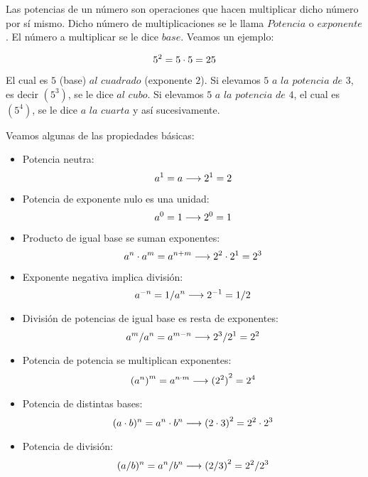Las potencias de un número son operaciones que hacen multiplicar dicho número por sí mismo. Dicho número de multiplicaciones se le llama $Potencia$ o $exponente$. El número a multiplicar se le dice $base$. Veamos un ejemplo:

\begin{equation}
    \notag
    5^2=5\cdot5=25
\end{equation}


El cual es $5$ (base) $al$ $cuadrado$ (exponente $2$). Si elevamos $5$ $a$ $la$ $potencia$ $de$ $3$, es decir $(5^3)$, se le dice $al$ $cubo$. Si elevamos $5$ $a$ $la$ $potencia$ $de$ $4$, el cual es $(5^4)$, se le dice $a$ $la$ $cuarta$ y así sucesivamente.\\
\medskip

Veamos algunas de las propiedades básicas: \\

\begin{itemize}
    \item Potencia neutra: 
    \begin{equation}
        \notag
        a^1=a \longrightarrow 2^1=2
    \end{equation}
    \item Potencia de exponente nulo es una unidad: 
    \begin{equation}
        \notag
        a^0=1 \longrightarrow 2^0=1
    \end{equation} 
    \item Producto de igual base se suman exponentes: 
    \begin{equation}
        \notag
        a^n \cdot a^m = a^{n+m} \longrightarrow 2^2\cdot 2^1=2^3 
    \end{equation} 
    \item Exponente negativa implica división: 
    \begin{equation}
        \notag
        a^{-n}=1/a^n \longrightarrow 2^{-1}=1/2  
    \end{equation} 
    \item División de potencias de igual base es resta de exponentes: 
     \begin{equation}
        \notag
        a^m / a^n = a^{m-n} \longrightarrow 2^3/2^1 = 2^2
    \end{equation} 
    \item Potencia de potencia se multiplican exponentes:
     \begin{equation}
        \notag
        {(a^n)}^m = a^{n\cdot m} \longrightarrow {(2^2)}^2 = 2^4 
    \end{equation}  
    \item Potencia de distintas bases:
     \begin{equation}
        \notag
        (a\cdot b)^n =a^n\cdot b^n \longrightarrow {(2\cdot 3)}^2 = 2^2 \cdot 2^3
    \end{equation}  
    \item Potencia de división:
     \begin{equation}
        \notag
        (a/ b)^n =a^n / b^n \longrightarrow {(2 / 3)}^2 = 2^2 / 2^3
    \end{equation}  
\end{itemize}

